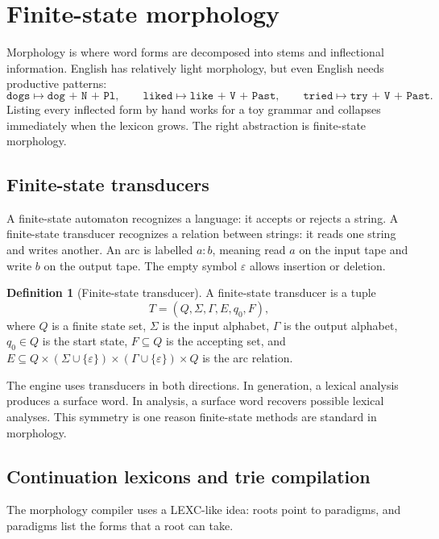 \documentclass[11pt]{article}
\theoremstyle{definition}
\newtheorem{definition}{Definition}[section]
\theoremstyle{plain}
\theoremstyle{remark}
\newcommand{\eps}{\varepsilon}
\begin{document}
\section{Finite-state morphology}

Morphology is where word forms are decomposed into stems and inflectional information.
English has relatively light morphology, but even English needs productive patterns:
\[
  \texttt{dogs} \mapsto \texttt{dog + N + Pl},
  \qquad
  \texttt{liked} \mapsto \texttt{like + V + Past},
  \qquad
  \texttt{tried} \mapsto \texttt{try + V + Past}.
\]
Listing every inflected form by hand works for a toy grammar and collapses immediately when the
lexicon grows. The right abstraction is finite-state morphology.

\subsection{Finite-state transducers}

A finite-state automaton recognizes a language: it accepts or rejects a string. A finite-state
transducer recognizes a relation between strings: it reads one string and writes another. An arc
is labelled $a:b$, meaning read $a$ on the input tape and write $b$ on the output tape. The empty
symbol $\eps$ allows insertion or deletion.

\begin{definition}[Finite-state transducer]
A finite-state transducer is a tuple
\[
  T = (Q,\Sigma,\Gamma,E,q_0,F),
\]
where $Q$ is a finite state set, $\Sigma$ is the input alphabet, $\Gamma$ is the output alphabet,
$q_0 \in Q$ is the start state, $F \subseteq Q$ is the accepting set, and
$E \subseteq Q \times (\Sigma \cup \{\eps\}) \times (\Gamma \cup \{\eps\}) \times Q$ is the arc
relation.
\end{definition}

The engine uses transducers in both directions. In generation, a lexical analysis produces a
surface word. In analysis, a surface word recovers possible lexical analyses. This symmetry is
one reason finite-state methods are standard in morphology.

\subsection{Continuation lexicons and trie compilation}

The morphology compiler uses a LEXC-like idea: roots point to paradigms, and paradigms list the
forms that a root can take.
\end{document}
